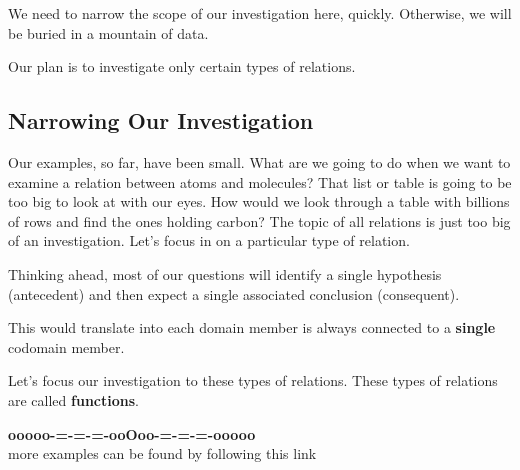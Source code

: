 \documentclass{ximera}
\begin{document}
We need to narrow the scope of our investigation here, quickly. Otherwise, we will be buried in a mountain of data.

Our plan is to investigate only certain types of relations.








\subsection*{Narrowing Our Investigation}


Our examples, so far, have been small.  What are we going to do when we want to examine a relation between atoms and molecules?  That list or table is going to be too big to look at with our eyes.  How would we look through a table with billions of rows and find the ones holding carbon?  The topic of all relations is just too big of an investigation. Let's focus in on a particular type of relation.

Thinking ahead, most of our questions will identify a single hypothesis (antecedent) and then expect a single associated conclusion (consequent).

This would translate into each domain member is always connected to a \textbf{\textcolor{purple!85!blue}{single}} codomain member.

Let's focus our investigation to these types of relations.  These types of relations are called \textbf{\textcolor{purple!85!blue}{functions}}.














\begin{onlineOnly}
\begin{center}
\textbf{\textcolor{green!50!black}{ooooo-=-=-=-ooOoo-=-=-=-ooooo}} \\

more examples can be found by following this link\\ 

\end{center}
\end{onlineOnly}
\end{document}
